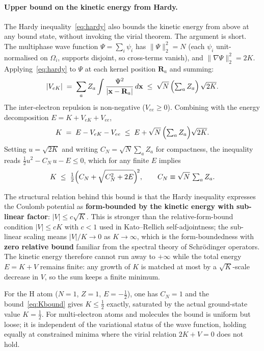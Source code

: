 \documentclass[11pt]{article}
\begin{document}
\paragraph{Upper bound on the kinetic energy from Hardy.}
The Hardy inequality~\eqref{eq:hardy} also bounds the kinetic energy from above at any bound state, without invoking the virial theorem. The argument is short. The multiphase wave function $\Psi = \sum_i \psi_i$ has $\|\Psi\|_2^2 = N$ (each $\psi_i$ unit-normalised on $\Omega_i$, supports disjoint, so cross-terms vanish), and $\|\nabla \Psi\|_2^2 = 2K$. Applying~\eqref{eq:hardy} to $\Psi$ at each kernel position $\mathbf{R}_a$ and summing:
\begin{equation}\label{eq:Vbound}
|V_{eK}| \;=\; \sum_a Z_a \int \frac{\Psi^2}{|\mathbf{x} - \mathbf{R}_a|}\, d\mathbf{x}
\;\le\; \sqrt{N}\,\Bigl(\textstyle\sum_a Z_a\Bigr)\, \sqrt{2K}.
\end{equation}
The inter-electron repulsion is non-negative ($V_{ee} \ge 0$). Combining with the energy decomposition $E = K + V_{eK} + V_{ee}$,
\begin{equation}
K \;=\; E - V_{eK} - V_{ee} \;\le\; E + \sqrt{N}\,\Bigl(\textstyle\sum_a Z_a\Bigr)\sqrt{2K}.
\end{equation}
Setting $u = \sqrt{2K}$ and writing $C_N = \sqrt{N}\sum_a Z_a$ for compactness, the inequality reads $\tfrac{1}{2}u^2 - C_N\, u - E \le 0$, which for any finite $E$ implies
\begin{equation}\label{eq:Kbound}
K \;\le\; \tfrac{1}{2}\Bigl(C_N + \sqrt{C_N^2 + 2E}\Bigr)^{\!2}, \qquad C_N \equiv \sqrt{N}\,\textstyle\sum_a Z_a.
\end{equation}

The structural relation behind this bound is that the Hardy inequality expresses the Coulomb potential as \textbf{form-bounded by the kinetic energy with sub-linear factor}: $|V| \le c\sqrt{K}$. This is stronger than the relative-form-bound condition $|V| \le c K$ with $c < 1$ used in Kato--Rellich self-adjointness; the sub-linear scaling means $|V|/K \to 0$ as $K \to \infty$, which is the form-boundedness with \textbf{zero relative bound} familiar from the spectral theory of Schr\"odinger operators. The kinetic energy therefore cannot run away to $+\infty$ while the total energy $E = K + V$ remains finite: any growth of $K$ is matched at most by a $\sqrt{K}$-scale decrease in $V$, so the sum keeps a finite minimum.

For the H atom ($N = 1$, $Z = 1$, $E = -\tfrac{1}{2}$), one has $C_N = 1$ and the bound~\eqref{eq:Kbound} gives $K \le \tfrac{1}{2}$ exactly, saturated by the actual ground-state value $K = \tfrac{1}{2}$. For multi-electron atoms and molecules the bound is uniform but loose; it is independent of the variational status of the wave function, holding equally at constrained minima where the virial relation $2K + V = 0$ does not hold.
\end{document}
